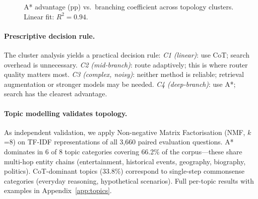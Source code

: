 \documentclass[11pt]{article}
\begin{document}
\begin{figure}[t]
\centering

\caption{A* advantage (pp) vs.\ branching coefficient across topology clusters. Linear fit: $R^2=0.94$.}
\label{fig:topology_scatter}
\end{figure}

\paragraph{Prescriptive decision rule.}
The cluster analysis yields a practical decision rule: \emph{C1 (linear)}: use CoT; search overhead is unnecessary. \emph{C2 (mid-branch)}: route adaptively; this is where router quality matters most. \emph{C3 (complex, noisy)}: neither method is reliable; retrieval augmentation or stronger models may be needed. \emph{C4 (deep-branch)}: use A*; search has the clearest advantage.

\paragraph{Topic modelling validates topology.}
As independent validation, we apply Non-negative Matrix Factorisation (NMF, $k$=8) on TF-IDF representations of all 3,660 paired evaluation questions. A* dominates in 6 of 8 topic categories covering 66.2\% of the corpus---these share multi-hop entity chains (entertainment, historical events, geography, biography, politics). CoT-dominant topics (33.8\%) correspond to single-step commonsense categories (everyday reasoning, hypothetical scenarios). Full per-topic results with examples in Appendix~\ref{app:topics}.
\end{document}
